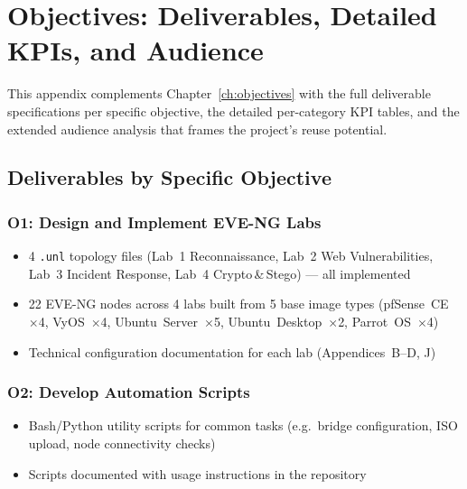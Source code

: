 
\chapter{Objectives: Deliverables, Detailed KPIs, and Audience}
\label{app:objectives-detail}

This appendix complements Chapter~\ref{ch:objectives} with the full deliverable specifications
per specific objective, the detailed per-category KPI tables, and the extended audience
analysis that frames the project's reuse potential.

\section{Deliverables by Specific Objective}

\subsection{O1: Design and Implement EVE-NG Labs}

\begin{itemize}
\item 4 \texttt{.unl} topology files (Lab~1 Reconnaissance, Lab~2 Web Vulnerabilities,
      Lab~3 Incident Response, Lab~4 Crypto\,\&\,Stego) --- all implemented
\item 22 EVE-NG nodes across 4 labs built from 5 base image types
      (pfSense~CE~$\times$4, VyOS~$\times$4, Ubuntu~Server~$\times$5,
       Ubuntu~Desktop~$\times$2, Parrot~OS~$\times$4)
\item Technical configuration documentation for each lab (Appendices~B--D, J)
\end{itemize}

\subsection{O2: Develop Automation Scripts}

\begin{itemize}
\item Bash/Python utility scripts for common tasks (e.g.\ bridge configuration,
      ISO upload, node connectivity checks)
\item Scripts documented with usage instructions in the repository
\end{itemize}

